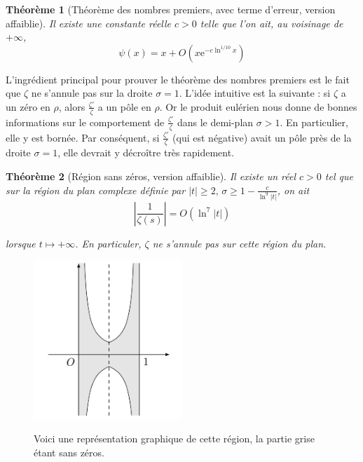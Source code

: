 \documentclass[french]{report}
\newtheorem{theorem}{Théorème}[section]
\begin{document}
\begin{theorem}[Théorème des nombres premiers, avec terme d'erreur, version affaiblie]\label{eq:tnp-erreur-1}
  Il existe une constante réelle $c>0$ telle que l'on ait, au voisinage de $+\infty$,
  \begin{equation}
    \psi(x)=x+O(x\mathrm{e}^{-c\ln^{1/10} x})
  \end{equation}
\end{theorem}

L'ingrédient principal pour prouver le théorème des nombres premiers est le fait que $\zeta$ ne s'annule pas sur la droite $\sigma=1$. L'idée intuitive est la suivante : si $\zeta$ a un zéro en $\rho$, alors $\frac{\zeta'}{\zeta}$ a un pôle en $\rho$. Or le produit eulérien nous donne de bonnes informations sur le comportement de $\frac{\zeta'}{\zeta}$ dans le demi-plan $\sigma>1$. En particulier, elle y est bornée. Par conséquent, si $\frac{\zeta'}{\zeta}$  (qui est négative) avait un pôle près de la droite $\sigma=1$, elle devrait y décroître très rapidement.

\begin{theorem}[Région sans zéros, version affaiblie]\label{eq:region-faible-sans-zero}
  Il existe un réel $c>0$ tel que sur la région du plan complexe définie par $|t|\geq2,\,\sigma\geq1-\frac{c}{\ln^9|t|}$, on ait
  \[ \left|\frac{1}{\zeta(s)}\right| = O(\ln^7|t|) \]

  lorsque $t\mapsto+\infty$. En particuler, $\zeta$ ne s'annule pas sur cette région du plan.
\end{theorem}

\begin{figure}[h]
  \centering
  \caption{Voici une représentation graphique de cette région, la partie grise étant sans zéros.}
  \includegraphics[width=0.5\textwidth]{fig_region_sans_zeros.png}
  \label{fig:region-sans-zero}
\end{figure}
    
\end{document}

